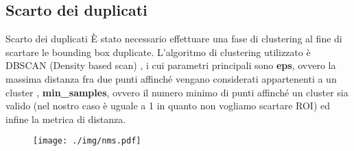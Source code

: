 \documentclass[10pt]{beamer}
\begin{document}
	\subsection{Scarto dei duplicati}\label{subsec:Scarto-dei-duplicati}

	\begin{frame}[allowframebreaks]{Scarto dei duplicati}
		È stato necessario effettuare una fase di clustering al fine di
		scartare le bounding box duplicate. L'algoritmo di clustering
		utilizzato è DBSCAN (Density based scan) \cite{dbscan}, i cui parametri
		principali sono \textbf{eps}, ovvero la massima distanza fra due punti
		affinché vengano considerati appartenenti a un cluster ,
		\textbf{min\_samples}, ovvero il numero minimo di punti affinché un
		cluster sia valido (nel nostro caso è uguale a 1 in quanto non vogliamo
		scartare ROI) ed infine la metrica di distanza.
		
		\begin{figure}[H]
			\centering
			\texttt{[image: ./img/nms.pdf]}
		\end{figure}
	\end{frame}
\end{document}
